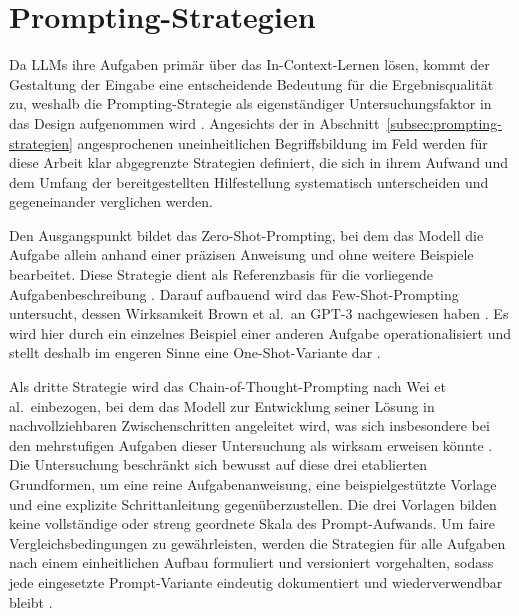 \section{Prompting-Strategien}
\label{sec:prompting-strategien-konzept}

Da \acp{LLM} ihre Aufgaben primär über das In-Context-Lernen lösen, kommt der Gestaltung der Eingabe eine entscheidende Bedeutung für die Ergebnisqualität zu, weshalb die Prompting-Strategie als eigenständiger Untersuchungsfaktor in das Design aufgenommen wird \autocite{sahooSystematicSurveyPrompt,schulhoffPromptReportSystematic2025}. Angesichts der in Abschnitt~\ref{subsec:prompting-strategien} angesprochenen uneinheitlichen Begriffsbildung im Feld werden für diese Arbeit klar abgegrenzte Strategien definiert, die sich in ihrem Aufwand und dem Umfang der bereitgestellten Hilfestellung systematisch unterscheiden und gegeneinander verglichen werden.

Den Ausgangspunkt bildet das Zero-Shot-Prompting, bei dem das Modell die Aufgabe allein anhand einer präzisen Anweisung und ohne weitere Beispiele bearbeitet. Diese Strategie dient als Referenzbasis für die vorliegende Aufgabenbeschreibung \autocite{liuPretrainPromptPredict2023,sahooSystematicSurveyPrompt}. Darauf aufbauend wird das Few-Shot-Prompting untersucht, dessen Wirksamkeit Brown et al.\ an GPT-3 nachgewiesen haben \autocite{brownLanguageModelsFewShot2020}. Es wird hier durch ein einzelnes Beispiel einer anderen Aufgabe operationalisiert und stellt deshalb im engeren Sinne eine One-Shot-Variante dar \autocite{liuPretrainPromptPredict2023}.

Als dritte Strategie wird das Chain-of-Thought-Prompting nach Wei et al.\ einbezogen, bei dem das Modell zur Entwicklung seiner Lösung in nachvollziehbaren Zwischenschritten angeleitet wird, was sich insbesondere bei den mehrstufigen Aufgaben dieser Untersuchung als wirksam erweisen könnte \autocite{weiChainOfThought2022,sahooSystematicSurveyPrompt}. Die Untersuchung beschränkt sich bewusst auf diese drei etablierten Grundformen, um eine reine Aufgabenanweisung, eine beispielgestützte Vorlage und eine explizite Schrittanleitung gegenüberzustellen. Die drei Vorlagen bilden keine vollständige oder streng geordnete Skala des Prompt-Aufwands. Um faire Vergleichsbedingungen zu gewährleisten, werden die Strategien für alle Aufgaben nach einem einheitlichen Aufbau formuliert und versioniert vorgehalten, sodass jede eingesetzte Prompt-Variante eindeutig dokumentiert und wiederverwendbar bleibt \autocite{schulhoffPromptReportSystematic2025,changEfficientPromptingMethods2024}.

